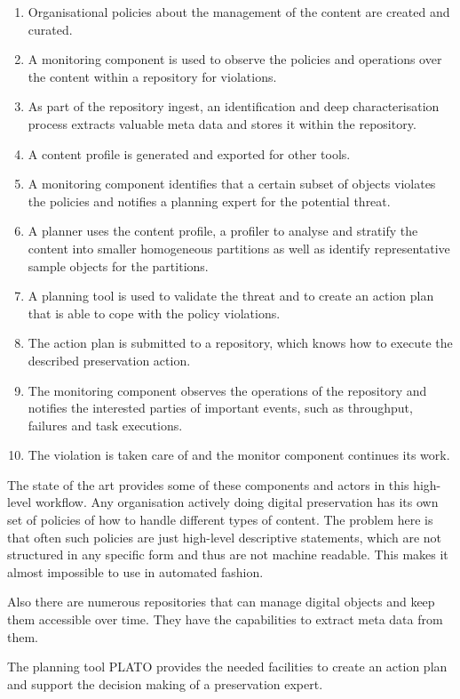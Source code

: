 \begin{enumerate}
\item Organisational policies about the management of the content are created and curated.
\item A monitoring component is used to observe the policies and operations over the content within a repository for violations.
\item As part of the repository ingest, an identification and deep characterisation process extracts valuable meta data and stores it within the repository.
\item A content profile is generated and exported for other tools.
\item A monitoring component identifies that a certain subset of objects violates the policies and notifies a planning expert for the potential threat.
\item A planner uses the content profile, a profiler to analyse and stratify the content into smaller homogeneous partitions as well as identify representative sample objects for the partitions.
\item A planning tool is used to validate the threat and to create an action plan that is able to cope with the policy violations.
\item The action plan is submitted to a repository, which knows how to execute the described preservation action.
\item The monitoring component observes the operations of the repository and notifies the interested parties of important events, such as throughput, failures and task executions. 
\item The violation is taken care of and the monitor component continues its work.
\end{enumerate}

The state of the art provides some of these components and actors in this high-level workflow. Any organisation actively doing digital preservation has its own set of policies of how to handle different types of content. The problem here is that often such policies are just high-level descriptive statements, which are not structured in any specific form and thus are not machine readable. This makes it almost impossible to use in automated fashion.

Also there are numerous repositories that can manage digital objects and keep them accessible over time. They have the capabilities to extract meta data from them.

The planning tool PLATO provides the needed facilities to create an action plan and support the decision making of a preservation expert.

